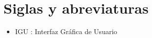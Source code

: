 \chapter*{Siglas y abreviaturas}
\begin{itemize}
\item IGU : Interfaz Gráfica de Usuario
\end{itemize}
